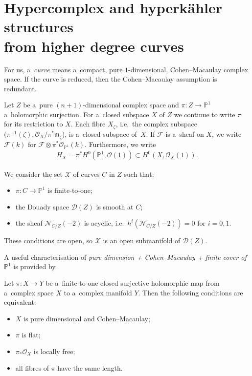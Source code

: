 \section{Hypercomplex and hyperk\"ahler structures\\ from higher degree curves}\label{hgc}

For us, a~{\em curve} means a~compact, pure $1$-dimensional, Cohen--Macaulay complex space.
If the curve is reduced, then the Cohen--Macaulay assumption is redundant.

Let $Z$ be a~pure $(n+1)$-dimensional complex space and $\pi:Z\to {\mathbb{P}}^1$ a~holomorphic surjection.
For a~closed subspace $X$ of $Z$ we continue to write $\pi$ for its restriction to $X$.
Each f\/ibre $X_\zeta$, i.e.\
the complex subspace $(\pi^{-1}(\zeta), {\mathcal{O}}_X/\pi^\ast\mathfrak{m}_\zeta$), is a~closed subspace of~$X$.
If ${\mathcal{F}}$ is a~sheaf on $X$, we write ${\mathcal{F}}(k)$ for ${\mathcal{F}}\otimes \pi^\ast
{\mathcal{O}}_{{\mathbb{P}}^1}(k)$.
Furthermore, we write
\begin{gather*}
H_X=\pi^\ast H^0({\mathbb{P}}^1,{\mathcal{O}}(1)) \subset H^0(X,{\mathcal{O}}_X(1)).
\end{gather*}

We consider the set ${\mathcal{X}}$ of curves $C$ in $Z$ such that:
\begin{itemize}\itemsep=0pt
\item
$\pi:C\to {\mathbb{P}}^1$ is f\/inite-to-one;
\item
the Douady space ${\mathcal{D}}(Z)$ is smooth at $C$;
\item
the sheaf ${\mathcal{N}}_{C/Z}(-2)$ is acyclic, i.e.\
$h^i({\mathcal{N}}_{C/Z}(-2))=0$ for $i=0,1$.
\end{itemize}
These conditions are open, so ${\mathcal{X}}$ is an open submanifold of ${\mathcal{D}}(Z)$.

A useful characterisation of {\em pure dimension + Cohen--Macaulay + finite cover of ${\mathbb{P}}^1$} is provided by

\begin{Lemma}\label{CM}
Let $\pi:X\to Y$ be a~finite-to-one closed surjective holomorphic map from a~complex space $X$ to a~complex manifold
$Y$.
Then the following conditions are equivalent:
\begin{itemize}\itemsep=0pt
\item[$(i)$] $X$ is pure dimensional and Cohen--Macaulay;
\item[$(ii)$] $\pi$ is flat;
\item[$(iii)$] $\pi_\ast{\mathcal{O}}_X$ is locally free;
\item[$(iv)$] all fibres of $\pi$ have the same length.
\end{itemize}
\end{Lemma}

